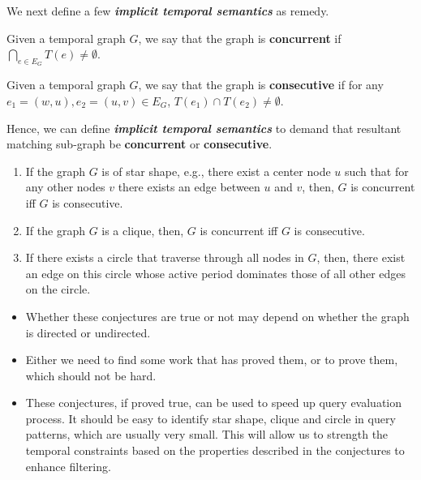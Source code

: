We next define a few {\bf {\em implicit temporal semantics}} as remedy. 

\begin{defn}
  \label{def:concur}
  Given a temporal graph $G$, we say that the graph is {\bf concurrent} if
  $\displaystyle\bigcap_{e \in E_G}T(e) \not= \emptyset$.
\end{defn}

\begin{defn}
  \label{def:consec}
  Given a temporal graph $G$, we say that the graph is {\bf consecutive} if for
  any $e_1 = (w,u) ,e_2=(u,v) \in E_G$, $T(e_1) \cap T(e_2) \not= \emptyset$.
\end{defn}

Hence, we can define {\bf {\em implicit temporal semantics}} to demand that
resultant matching sub-graph be {\bf concurrent }or {\bf consecutive}.

\SmallSpace
{}
 \begin{enumerate}
	\item If the graph $G$ is of star shape, e.g., there exist a center node
          $u$ such that for any other nodes $v$ there exists an edge between $u$
          and $v$, then, $G$ is concurrent iff $G$ is consecutive.
	\item If the graph $G$ is a clique, then, $G$ is concurrent iff $G$ is
          consecutive.
	\item If there exists a circle that traverse through all nodes in $G$,
          then, there exist an edge on this circle whose active period dominates
          those of all other edges on the circle.
	
\end{enumerate}

\begin{itemize}
	\item Whether these conjectures are true or not may depend on whether
          the graph is directed or undirected.
	\item Either we need to find some work that has proved them, or to prove
          them, which should not be hard.
	\item These conjectures, if proved true, can be used to speed up query
          evaluation process. It should be easy to identify star shape, clique
          and circle in query patterns, which are usually very small. This will
          allow us to strength the temporal constraints based on the properties
          described in the conjectures to enhance filtering.

\end{itemize}
